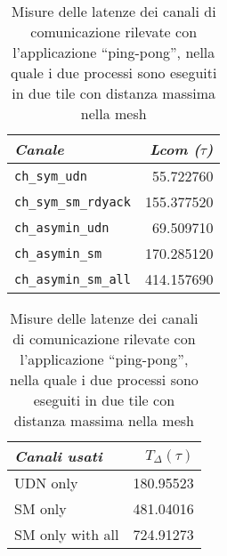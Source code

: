\begin{table}[!b]
  \begin{subtable}[b]{.5\textwidth}
    \begin{tabular}{|l|r|}
      \hline
      \emph{Canale} & \emph{Lcom ($\tau$)}\\
      \hline
      \verb+ch_sym_udn+ & 55.722760 \\
      \verb+ch_sym_sm_rdyack+ & 155.377520 \\
      \verb+ch_asymin_udn+ & 69.509710 \\
      \verb+ch_asymin_sm+ & 170.285120 \\
      \verb+ch_asymin_sm_all+ & 414.157690  \\
      \hline
    \end{tabular}
  \end{subtable}
  \hspace{4ex}
  \begin{subtable}[b]{.5\textwidth}
    \begin{tabular}{|l|r|}
      \hline
      \emph{Canali usati} & $T_\Delta (\tau)$ \\
      \hline
      UDN only & 180.95523 \\
      SM only & 481.04016 \\
      SM only with all & 724.91273 \\
      \hline
    \end{tabular}
  \end{subtable}
  \caption{Misure delle latenze dei canali di comunicazione rilevate con l'applicazione ``ping-pong'', nella quale i due processi sono eseguiti in due tile con distanza massima nella mesh}
  \label{tab:ch_and_delta}
\end{table}

